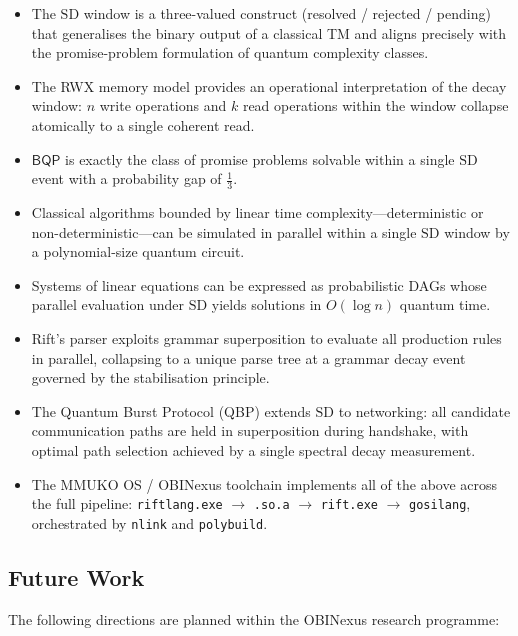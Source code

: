 \documentclass[12pt, a4paper]{article}
\theoremstyle{plain}
\theoremstyle{definition}
\theoremstyle{remark}
\newcommand{\bqp}{\ensuremath{\mathsf{BQP}}}
\newcommand{\SD}{\ensuremath{\mathrm{SD}}}   %
\begin{document}
\begin{itemize}
  \item The \SD{} window is a three-valued construct (resolved / rejected /
        pending) that generalises the binary output of a classical TM and
        aligns precisely with the promise-problem formulation of quantum
        complexity classes.
  \item The RWX memory model provides an operational interpretation of the
        decay window: $n$ write operations and $k$ read operations within
        the window collapse atomically to a single coherent read.
  \item $\bqp$ is exactly the class of promise problems solvable within a
        single \SD{} event with a probability gap of $\tfrac{1}{3}$.
  \item Classical algorithms bounded by linear time complexity---deterministic
        or non-deterministic---can be simulated in parallel within a single
        \SD{} window by a polynomial-size quantum circuit.
  \item Systems of linear equations can be expressed as probabilistic DAGs
        whose parallel evaluation under \SD{} yields solutions in
        $O(\log n)$ quantum time.
  \item Rift's parser exploits grammar superposition to evaluate all
        production rules in parallel, collapsing to a unique parse tree at a
        grammar decay event governed by the stabilisation principle.
  \item The Quantum Burst Protocol (QBP) extends \SD{} to networking: all
        candidate communication paths are held in superposition during
        handshake, with optimal path selection achieved by a single spectral
        decay measurement.
  \item The MMUKO OS / OBINexus toolchain implements all of the above across
        the full pipeline: \texttt{riftlang.exe} $\to$ \texttt{.so.a} $\to$
        \texttt{rift.exe} $\to$ \texttt{gosilang}, orchestrated by
        \texttt{nlink} and \texttt{polybuild}.
\end{itemize}

\subsection{Future Work}

The following directions are planned within the OBINexus research programme:
\end{document}
